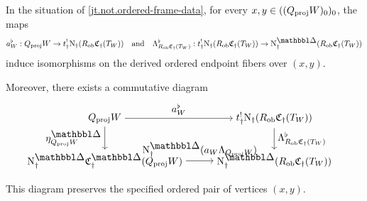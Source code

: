 \documentclass[a4paper,dvipdfmx,11pt]{amsart}
\begin{document}
\begin{lemma}\label{jt.lem.strict-ordered-frame-mate}
  In the situation of \cref{jt.not.ordered-frame-data}, for every $x,y\in((Q_{\mathrm{proj}}W)_0)_0$, the maps
  \begin{align}
    a_W^{\flat}
    :
    Q_{\proj}W \to t_{\dag}^{!}\N_{\dag}(R_{\rmob}\frakC_{\dag}(T_W))
    \quad \text{and} \quad
    \Lambda^{\flat}_{R_{\rmob}\frakC_{\dag}(T_W)}
    :
    t_{\dag}^{!}\N_{\dag}
    (R_{\rmob}\frakC_{\dag}(T_W)) \to \N^{\prism}_{\dag}(R_{\rmob}\frakC_{\dag}(T_W))
  \end{align}
  induce isomorphisms on the derived ordered endpoint fibers over $(x,y)$.

  Moreover, there exists a commutative diagram
  \begin{align}\label{jt.eq.ordered-frame-mate}
    &\begin{tikzpicture}[auto]
        \node (source) at (0,1.5) {$Q_{\proj}W$};
        \node (intermediate) at (6,1.5) {$
          t_{\dag}^{!}\N_{\dag}
          (R_{\rmob}\frakC_{\dag}(T_W))$};
        \node (source-nerve) at (0,0) {$
          \N^{\prism}_{\dag}
          \frakC^{\prism}_{\dag}(Q_{\proj}W)$};
        \node (target-nerve) at (6,0) {$
          \N^{\prism}_{\dag}
          (R_{\rmob}\frakC_{\dag}(T_W))$};
        \draw[->]
          (source) --
          node[above] {$a_W^{\flat}$}
          (intermediate);
        \draw[->]
          (source) --
          node[left] {$\eta^{\prism}_{Q_{\proj}W}$}
          (source-nerve);
        \draw[->]
          (intermediate) --
          node[right] {$\Lambda^{\flat}_{R_{\rmob}\frakC_{\dag}(T_W)}$}
          (target-nerve);
        \draw[->]
          (source-nerve) --
          node {$\N^{\prism}_{\dag}(a_W\Lambda_{Q_{\proj}W})$}
          (target-nerve);
      \end{tikzpicture}
  \end{align}
  This diagram preserves the specified ordered pair of vertices $(x,y)$.
\end{lemma}
\end{document}
